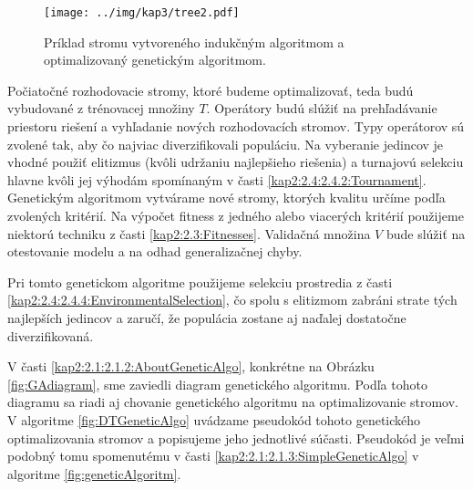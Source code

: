 \begin{figure}[h]
\centering
\centerline{\mbox{\texttt{[image: ../img/kap3/tree2.pdf]}}}
\caption{Príklad stromu vytvoreného indukčným algoritmom a optimalizovaný genetickým algoritmom.}\label{fig:treeGA}
\end{figure}

Počiatočné rozhodovacie stromy, ktoré budeme optimalizovať, teda budú vybudované z trénovacej množiny $T$. Operátory budú slúžiť na prehľadávanie priestoru riešení a vyhľadanie nových rozhodovacích stromov. Typy operátorov sú zvolené tak, aby čo najviac diverzifikovali populáciu. Na vyberanie jedincov je vhodné použiť elitizmus (kvôli udržaniu najlepšieho riešenia) a turnajovú selekciu hlavne kvôli jej výhodám spomínaným v časti \ref{kap2:2.4:2.4.2:Tournament}. Genetickým algoritmom vytvárame nové stromy, ktorých kvalitu určíme podľa zvolených kritérií. Na výpočet fitness z jedného alebo viacerých kritérií použijeme niektorú techniku z časti \ref{kap2:2.3:Fitnesses}. Validačná množina $V$ bude slúžiť na otestovanie modelu a na odhad generalizačnej chyby.

Pri tomto genetickom algoritme použijeme selekciu prostredia z časti \ref{kap2:2.4:2.4.4:EnvironmentalSelection}, čo spolu s elitizmom zabráni strate tých najlepších jedincov a zaručí, že populácia zostane aj naďalej dostatočne diverzifikovaná.

V časti \ref{kap2:2.1:2.1.2:AboutGeneticAlgo}, konkrétne na Obrázku \ref{fig:GAdiagram}, sme zaviedli diagram genetického algoritmu. Podľa tohoto diagramu sa riadi aj chovanie genetického algoritmu na optimalizovanie stromov.
V algoritme \ref{fig:DTGeneticAlgo} uvádzame pseudokód tohoto genetického optimalizovania stromov a popisujeme jeho jednotlivé súčasti.
Pseudokód je veľmi podobný tomu spomenutému v časti \ref{kap2:2.1:2.1.3:SimpleGeneticAlgo} v algoritme \ref{fig:geneticAlgoritm}.

